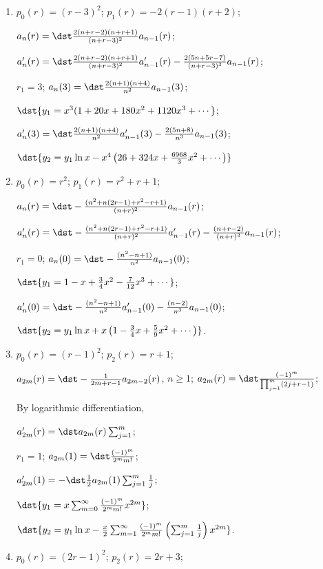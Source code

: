 \documentclass[openany]{book}
\newenvironment{sectionSolutions}{
 \begin{enumerate}[item-label={\thesection.\arabic{enumi}.}]
}{
 \end{enumerate}
}
\begin{document}
\begin{sectionSolutions}
\item
$p_0(r)=(r-3)^2$;
$p_1(r)=-2(r-1)(r+2)$;

$a_n(r)=\dst
\frac{2(n+r-2)(n+r+1)}{(n+r-3)^2}a_{n-1}(r)$;


$a_n'(r)=\dst
\frac{2(n+r-2)(n+r+1)}{(n+r-3)^2}a_{n-1}'(r)
-\frac{2(5n+5r-7)}{(n+r-3)^3}a_{n-1}(r)$;

$r_1=3$;
$a_n(3)=\dst
\frac{2(n+1)(n+4)}{ n^2}a_{n-1}(3)$;

$\dst{y_1=x^3(1+20x+180x^2+1120x^3+\cdots}$;

$a_n'(3)=\dst
\frac{2(n+1)(n+4)}{ n^2}a_{n-1}'(3)
-\frac{2(5n+8)}{ n^3}a_{n-1}(3)$;

$\dst{y_2=y_1\ln
x-x^4\left(26+324x+\frac{6968}{3}x^2+\cdots\right)}$


\item
$p_0(r)=r^2$;
$p_1(r)=r^2+r+1$;

$a_n(r)=\dst
-\frac{(n^2+n(2r-1)+r^2-r+1)}{(n+r)^2}a_{n-1}(r)$;


$a_n'(r)=\dst
-\frac{(n^2+n(2r-1)+r^2-r+1)}{(n+r)^2}a_{n-1}'(r)
-\frac{(n+r-2)}{(n+r)^3}a_{n-1}(r)$;

$r_1=0$;
$a_n(0)=\dst-\frac{(n^2-n+1)}{ n^2}a_{n-1}(0)$;

$\dst{y_1=1-x+\frac{3}{4}x^2-\frac{7}{12}x^3+\cdots}$;

$a_n'(0)=\dst
-\frac{(n^2-n+1)}{ n^2}a_{n-1}'(0)-\frac{(n-2)}{ n^3}a_{n-1}(0)$;

$\dst{y_2=y_1\ln x+x\left(1-\frac{3}{4}x+\frac{5}{9}x^2+\cdots\right)}$.



\item
$p_0(r)=(r-1)^2$;
$p_2(r)=r+1$;

$a_{2m}(r)=\dst-\frac{1}{ 2m+r-1}
a_{2m-2}(r)$, $n\ge1$;
 $a_{2m}(r)=\dst\frac{(-1)^m}{\prod_{j=1}^m(2j+r-1)}$;

By logarithmic differentiation,

$a_{2m}'(r)=\dst a_{2m}(r)\sum_{j=1}^m$;

$r_1=1$;
$a_{2m}(1)=\dst\frac{(-1)^m}{2^mm!}$;

$a_{2m}'(1)=-\dst\frac{1}{2}a_{2m}(1)\sum_{j=1}^m\frac{1}{ j}$;

$\dst{y_1=x\sum_{m=0}^\infty\frac{(-1)^m}{2^mm!}x^{2m}}$;

$\dst{y_2=y_1\ln x-\frac{x}{2}\sum_{m=1}^\infty\frac{(-1)^m}{
2^mm!}\left(\sum_{j=1}^m\frac{1}{ j}\right)x^{2m}}$.


\item
$p_0(r)=(2r-1)^2$;
$p_2(r)=2r+3$;


\end{sectionSolutions}
\end{document}
